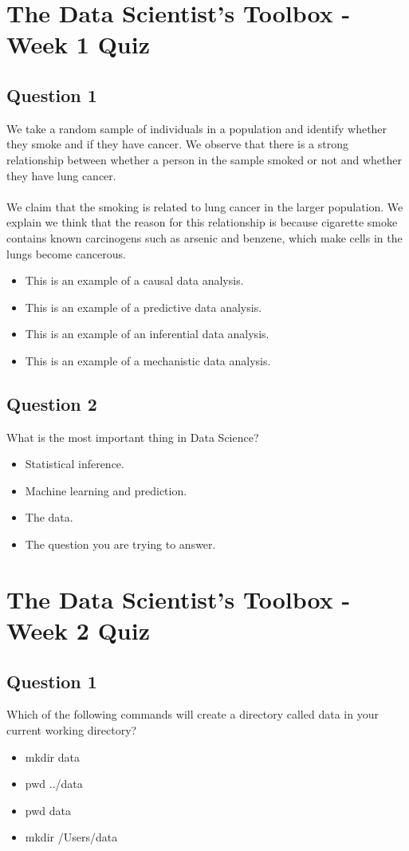 \documentclass[12pt]{article}
\begin{document}
\section*{The Data Scientist’s Toolbox - Week 1 Quiz}
\subsection*{Question 1}
We take a random sample of individuals in a population and identify whether they smoke and if they have cancer. We observe that there is a strong relationship between whether a person in the sample smoked or not and whether they have lung cancer. 
\\
\\
We claim that the smoking is related to lung cancer in the larger population. We explain we think that the reason for this relationship is because cigarette smoke contains known carcinogens such as arsenic and benzene, which make cells in the lungs become cancerous.
\begin{itemize}
\item This is an example of a causal data analysis.
\item This is an example of a predictive data analysis.
\item This is an example of an inferential data analysis.
\item This is an example of a mechanistic data analysis.
\end{itemize}
\newpage
\subsection*{Question 2}
What is the most important thing in Data Science?
\begin{itemize}
\item Statistical inference.
\item Machine learning and prediction.
\item The data.
\item The question you are trying to answer.
\end{itemize}

\newpage
\section*{The Data Scientist’s Toolbox - Week 2 Quiz}

\subsection*{Question 1}
Which of the following commands will create a directory called data in your current working directory?
\begin{itemize}
\item mkdir data
\item pwd ../data
\item pwd data
\item mkdir /Users/data
\end{itemize}
\end{document}
